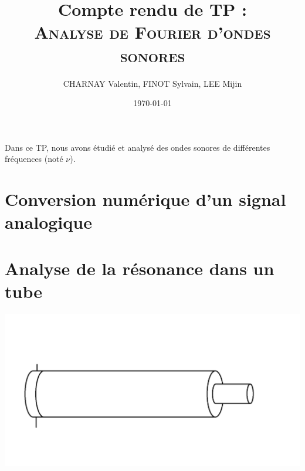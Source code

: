 \documentclass[12pt,a4paper]{article}
\author{CHARNAY Valentin, FINOT Sylvain, LEE Mijin}
\title{Compte rendu de TP :\\[4pt] \scshape Analyse de Fourier d'ondes sonores}
\date{\today}
\begin{document}
\maketitle
Dans ce TP, nous avons étudié et analysé des ondes sonores de différentes fréquences (noté $\nu$).
\section*{Conversion numérique d'un signal analogique}

\section*{Analyse de la résonance dans un tube}
\includegraphics[scale=0.5]{schetub1}
\end{document}

